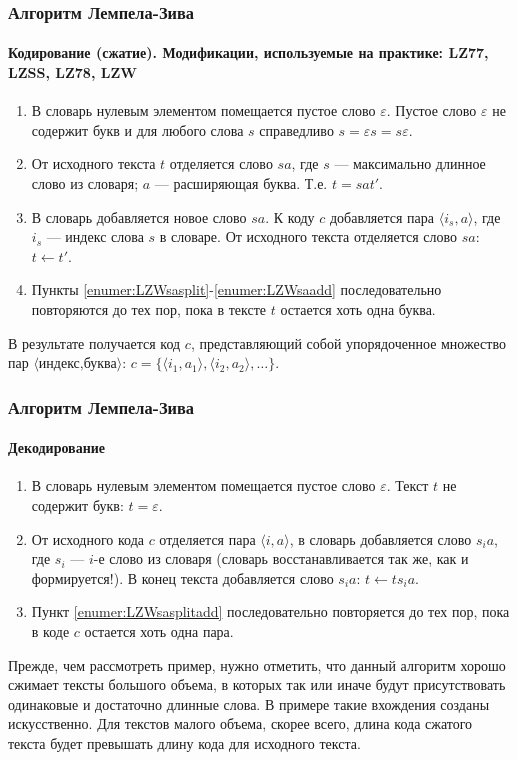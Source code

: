 \begin{frame}
\frametitle{Алгоритм Лемпела-Зива}
\framesubtitle{Кодирование (сжатие). Модификации, используемые на практике: LZ77, LZSS, LZ78, LZW}
\begin{enumerate}
    \item В словарь нулевым элементом помещается пустое слово $\varepsilon$. Пустое слово $\varepsilon$ не содержит букв и для любого слова $s$ справедливо $s=\varepsilon s=s\varepsilon$.
    \item \label{enumer:LZWsasplit} От исходного текста $t$ отделяется слово $sa$, где $s$ --- максимально длинное слово из словаря; $a$ --- расширяющая буква. Т.е. $t=sat'$.
    \item \label{enumer:LZWsaadd} В словарь добавляется новое слово $sa$. К коду $c$ добавляется пара $\langle i_s,a\rangle$, где $i_s$ --- индекс слова $s$ в словаре. От исходного текста отделяется слово $sa$: $t\gets t'$.
    \item Пункты \ref{enumer:LZWsasplit}-\ref{enumer:LZWsaadd} последовательно повторяются до тех пор, пока в тексте $t$ остается хоть одна буква.
\end{enumerate}
\end{frame}


В результате получается код $c$, представляющий собой упорядоченное множество  пар $\langle\text{индекс,буква}\rangle$: $c=\{\langle i_1,a_1\rangle,\langle i_2,a_2\rangle,\ldots\}$.


\begin{frame}
\frametitle{Алгоритм Лемпела-Зива}
\framesubtitle{Декодирование}
\begin{enumerate}
    \item В словарь нулевым элементом помещается пустое слово $\varepsilon$. Текст $t$ не содержит букв: $t=\varepsilon$.
    \item \label{enumer:LZWsasplitadd} От исходного кода $c$ отделяется пара $\langle i,a\rangle$, в словарь добавляется слово $s_{i}a$, где $s_i$ --- $i$-е слово из словаря (словарь восстанавливается так же, как и формируется!). В конец текста добавляется слово $s_{i}a$:  $t\gets ts_{i}a$.
    \item Пункт \ref{enumer:LZWsasplitadd} последовательно повторяется до тех пор, пока в коде $c$ остается хоть одна пара.
\end{enumerate}
\end{frame}


Прежде, чем рассмотреть пример, нужно отметить, что данный алгоритм хорошо сжимает тексты большого объема, в которых так или иначе будут присутствовать одинаковые и достаточно длинные слова. В примере такие вхождения созданы искусственно. Для текстов малого объема, скорее всего, длина кода сжатого текста будет превышать длину кода для исходного текста.

